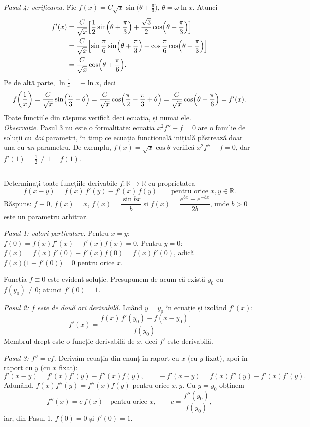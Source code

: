 \emph{Pasul 4: verificarea.} Fie $f(x)=C\sqrt x\sin\bigl(\theta+\frac\pi3\bigr)$, $\theta=\omega\ln x$. Atunci
\[ \begin{aligned} f'(x)&=\frac{C}{\sqrt x}\Bigl[\frac12\sin\Bigl(\theta+\frac\pi3\Bigr)+\frac{\sqrt3}{2}\cos\Bigl(\theta+\frac\pi3\Bigr)\Bigr]\\
&=\frac{C}{\sqrt x}\Bigl[\sin\frac\pi6\sin\Bigl(\theta+\frac\pi3\Bigr)+\cos\frac\pi6\cos\Bigl(\theta+\frac\pi3\Bigr)\Bigr]\\ &=\frac{C}{\sqrt x}\cos\Bigl(\theta+\frac\pi6\Bigr). \end{aligned} \]
Pe de altă parte, $\ln\frac1x=-\ln x$, deci
\[ f\!\left(\frac1x\right)=\frac{C}{\sqrt x}\sin\Bigl(\frac\pi3-\theta\Bigr)=\frac{C}{\sqrt x}\cos\Bigl(\frac\pi2-\frac\pi3+\theta\Bigr)=\frac{C}{\sqrt x}\cos\Bigl(\theta+\frac\pi6\Bigr)=f'(x) . \]
Toate funcțiile din răspuns verifică deci ecuația, și numai ele.\\[2pt]
\emph{Observație.} Pasul 3 nu este o formalitate: ecuația $x^2f''+f=0$ are o familie de soluții cu \emph{doi} parametri, în timp ce ecuația funcțională inițială păstrează doar una cu \emph{un} parametru. De exemplu, $f(x)=\sqrt x\cos\theta$ verifică $x^2f''+f=0$, dar $f'(1)=\frac12\neq1=f(1)$.
\vspace{1mm}\hrule

Determinați toate funcțiile derivabile $f:\mathbb{R}\to\mathbb{R}$ cu proprietatea
\[ f(x-y)=f(x)\,f'(y)-f'(x)\,f(y)\qquad\text{pentru orice }x,y\in\mathbb{R} . \]
\sol Răspuns: $f\equiv0$, $f(x)=x$, $f(x)=\dfrac{\sin bx}{b}$ și $f(x)=\dfrac{e^{bx}-e^{-bx}}{2b}$, unde $b>0$ este un parametru arbitrar.

\emph{Pasul 1: valori particulare.} Pentru $x=y$: $f(0)=f(x)f'(x)-f'(x)f(x)=0$. Pentru $y=0$: $f(x)=f(x)f'(0)-f'(x)f(0)=f(x)f'(0)$, adică $f(x)\bigl(1-f'(0)\bigr)=0$ pentru orice $x$.

Funcția $f\equiv0$ este evident soluție. Presupunem de acum că există $y_0$ cu $f(y_0)\neq0$; atunci $f'(0)=1$.

\emph{Pasul 2: $f$ este de două ori derivabilă.} Luând $y=y_0$ în ecuație și izolând $f'(x)$:
\[ f'(x)=\frac{f(x)\,f'(y_0)-f(x-y_0)}{f(y_0)} . \]
Membrul drept este o funcție derivabilă de $x$, deci $f'$ este derivabilă.

\emph{Pasul 3: $f''=cf$.} Derivăm ecuația din enunț în raport cu $x$ (cu $y$ fixat), apoi în raport cu $y$ (cu $x$ fixat):
\[ f'(x-y)=f'(x)f'(y)-f''(x)f(y),\qquad -f'(x-y)=f(x)f''(y)-f'(x)f'(y) . \]
Adunând, $f(x)f''(y)=f''(x)f(y)$ pentru orice $x,y$. Cu $y=y_0$ obținem
\[ f''(x)=c\,f(x)\quad\text{pentru orice }x,\qquad c=\frac{f''(y_0)}{f(y_0)} , \]
iar, din Pasul 1, $f(0)=0$ și $f'(0)=1$.


